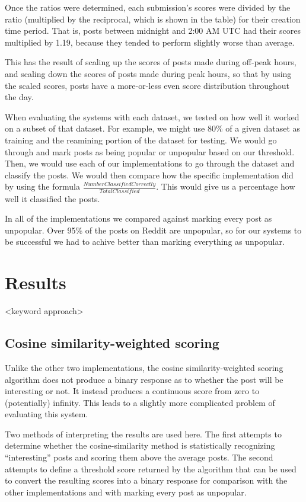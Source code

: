 \documentclass{acm_proc_article-sp}
\begin{document}
Once the ratios were determined, each submission's scores were divided by the ratio (multiplied by the reciprocal, which is shown in the
table) for their creation time period.  That is, posts between midnight and 2:00 AM UTC had their scores multiplied by 1.19, because they
tended to perform slightly worse than average.

This has the result of scaling up the scores of posts made during off-peak hours, and scaling down the scores of posts made during peak
hours, so that by using the scaled scores, posts have a more-or-less even score distribution throughout the day.

When evaluating the systems with each dataset, we tested on how well it worked on a subset of that dataset. For example, we might use 80\% of a given dataset as training and the reamining portion of the dataset for testing. We would go through and mark posts as being popular or unpopular based on our threshold. Then, we would use each of our implementations to go through the dataset and classify the posts. We would then compare how the specific implementation did by using the formula $\frac{Number Classified Correctly}{Total Classified}$. This would give us a percentage how well it classified the posts.

In all of the implementations we compared against marking every post as unpopular. Over 95\% of the posts on Reddit are unpopular, so for our systems to be successful we had to achive better than marking everything as unpopular. 

\section{Results}

<keyword approach>

\subsection{Cosine similarity-weighted scoring}

Unlike the other two implementations, the cosine similarity-weighted scoring algorithm does not produce a binary
response as to whether the post will be interesting or not.  It instead produces a continuous score from zero
to (potentially) infinity.  This leads to a slightly more complicated problem of evaluating this system.

Two methods of interpreting the results are used here.  The first attempts to determine whether the cosine-similarity method
is statistically recognizing ``interesting'' posts and scoring them above the average posts.  The second attempts to define
a threshold score returned by the algorithm that can be used to convert the resulting scores into a binary response for
comparison with the other implementations and with marking every post as unpopular.
\end{document}
